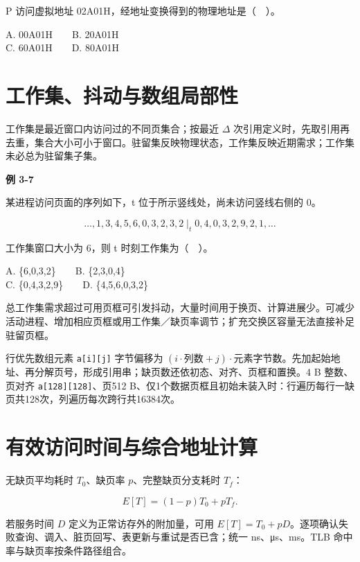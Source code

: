 P 访问虚拟地址 02A01H，经地址变换得到的物理地址是（　）。

A. 00A01H　　B. 20A01H\\
C. 60A01H　　D. 80A01H

\section{工作集、抖动与数组局部性}\label{OS03-working-set}

工作集是最近窗口内访问过的不同页集合；按最近 \(\Delta\) 次引用定义时，先取引用再去重，集合大小可小于窗口。驻留集反映物理状态，工作集反映近期需求；工作集未必总为驻留集子集。

\par\medskip{}\noindent\hypertarget{OS03-E07}{}\label{OS03-E07}\textbf{例 3-7}\par\nobreak\smallskip

某进程访问页面的序列如下，t 位于所示竖线处，尚未访问竖线右侧的 0。

\[\ldots,1,3,4,5,6,0,3,2,3,2\;\big|_{t}\;0,4,0,3,2,9,2,1,\ldots\]

工作集窗口大小为 6，则 t 时刻工作集为（　）。

A. \{6,0,3,2\}　　B. \{2,3,0,4\}\\
C. \{0,4,3,2,9\}　　D. \{4,5,6,0,3,2\}

总工作集需求超过可用页框可引发抖动，大量时间用于换页、计算进展少。可减少活动进程、增加相应页框或用工作集／缺页率调节；扩充交换区容量无法直接补足驻留页框。

行优先数组元素 \texttt{a[\allowbreak{}i]\allowbreak{}[\allowbreak{}j]\allowbreak{}} 字节偏移为 \((i\cdot\text{列数}+j)\cdot\text{元素字节数}\)。先加起始地址、再分解页号，形成引用串；缺页数还依初态、对齐、页框和置换。4 B 整数、页对齐 \texttt{a[\allowbreak{}128]\allowbreak{}[\allowbreak{}128]\allowbreak{}}、页512 B、仅1个数据页框且初始未装入时：行遍历每行一缺页共128次，列遍历每次跨行共16384次。

\section{有效访问时间与综合地址计算}\label{OS03-effective-time}

无缺页平均耗时 \(T_0\)、缺页率 \(p\)、完整缺页分支耗时 \(T_f\)：

\[E[T]=(1-p)T_0+pT_f.\]

若服务时间 \(D\) 定义为正常访存外的附加量，可用 \(E[T]=T_0+pD\)。逐项确认失败查询、调入、脏页回写、表更新与重试是否已含；统一 ns、μs、ms。TLB 命中率与缺页率按条件路径组合。

